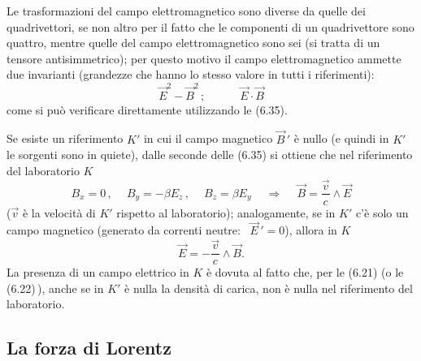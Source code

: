 Le trasformazioni del campo elettromagnetico sono diverse da quelle dei
quadrivettori, se non altro per il fatto che le componenti di un quadrivettore
sono quattro, mentre quelle del campo elettromagnetico sono sei (si tratta di un
tensore antisimmetrico); per questo motivo il campo elettromagnetico ammette due
invarianti (grandezze che hanno lo stesso valore in tutti i riferimenti):
\begin{equation}
  \vec E^2-\vec B^2\,;\qquad\quad\vec E\cdot\vec B
  \tag{6.36}
\end{equation}
come si pu\`o verificare direttamente utilizzando le (6.35).

Se esiste un riferimento $K'$ in cui il campo magnetico $\vec B\,'$ \`e nullo (e
quindi in $K'$ le sorgenti sono in quiete), dalle seconde delle (6.35) si
ottiene che nel riferimento del laboratorio $K$
\begin{equation}
  B_x=0\,,\quad\ B_y=-\beta E_z\,,\quad\ B_z=\beta E_y
  \quad\ \Rightarrow\quad\ \vec B=\frac{\vec v}{c}\wedge\vec E
  \tag{6.37}
\end{equation}
($\vec v$ \`e la velocit\`a di $K'$ rispetto al laboratorio); analogamente, se
in $K'$ c'\`e solo un campo magnetico (generato da correnti neutre:
\ $\vec E\,'=0$), allora in $K$
\begin{equation}
  \vec E=-\frac{\vec v}{c}\wedge\vec B.
  \tag{6.38}
\end{equation}
La presenza di un campo elettrico in $K$ \`e dovuta al fatto che, per le (6.21)
\big(o le (6.22)\,\big), anche se in $K'$ \`e nulla la densit\`a di carica, non
\`e nulla nel riferimento del laboratorio.

\subsection{La forza di Lorentz}

